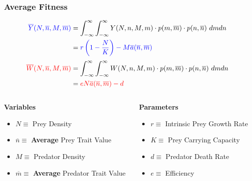 \documentclass[10pt]{beamer}
\begin{document}
\begin{frame}
	\frametitle{Average Fitness}
	\begin{align*}
	{\color{blue}\overline{Y}(N, \overline{n}, M, \overline{m})} &= \int_{-\infty}^{\infty}\int_{-\infty}^{\infty} Y(N, n, M, m) \cdot p(m, \overline{m}) \cdot p(n, \overline{n})\ dm dn \\
	&= {\color{blue}r\left(1 - \frac{N}{K}\right) - M\overline{a}(\overline{n}, \overline{m})} \\[.1cm]
	{\color{red}\overline{W}(N, \overline{n}, M, \overline{m})} &= \int_{-\infty}^{\infty}\int_{-\infty}^{\infty} W(N, n, M, m) \cdot p(m, \overline{m}) \cdot p(n, \overline{n})\ dm dn \\
	&= {\color{red}eN\overline{a}(\overline{n}, \overline{m}) - d}
	\end{align*}
	\begin{columns}
		\begin{column}{0.5\textwidth}
			{\bf Variables}
			\begin{itemize}
				\item \footnotesize{\color{blue}$N \equiv $ Prey Density}
				\item {\color{blue}$\overline{n} \equiv $ {\bf Average} Prey Trait Value}
				\item {\color{red}$M \equiv $ Predator Density}
				\item {\color{red}$\overline{m} \equiv $ {\bf Average} Predator Trait Value}
			\end{itemize}
		\end{column}
		\begin{column}{0.5\textwidth}
			{\bf Parameters}
			\begin{itemize}
				\item \footnotesize$r \equiv $ Intrinsic Prey Growth Rate
				\item $K \equiv $ Prey Carrying Capacity
				\item $d \equiv $ Predator Death Rate
				\item $e \equiv $ Efficiency
			\end{itemize}
		\end{column}
	\end{columns}
\end{frame}
\end{document}
